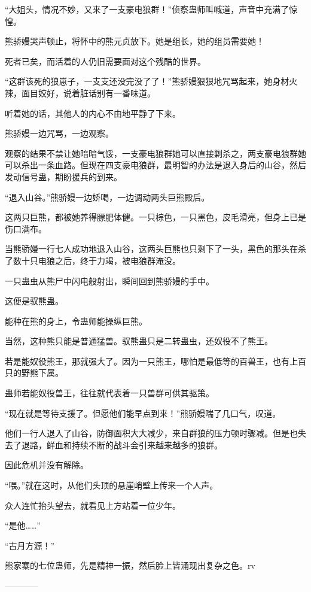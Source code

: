 \begin{this_body}
“大姐头，情况不妙，又来了一支豪电狼群！”侦察蛊师叫喊道，声音中充满了惊惶。

熊骄嫚哭声顿止，将怀中的熊元贞放下。她是组长，她的组员需要她！

死者已矣，而活着的人仍旧需要面对这个残酷的世界。

“这群该死的狼崽子，一支支还没完没了了！”熊骄嫚狠狠地咒骂起来，她身材火辣，面目姣好，说着脏话别有一番味道。

听着她的话，其他人的内心不由地平静了下来。

熊骄嫚一边咒骂，一边观察。

观察的结果不禁让她暗暗气馁，一支豪电狼群她可以直接剿杀之，两支豪电狼群她可以杀出一条血路。但现在四支豪电狼群，最明智的办法是退入身后的山谷，然后发动信号蛊，期盼援兵的到来。

“退入山谷。”熊骄嫚一边娇喝，一边调动两头巨熊殿后。

这两只巨熊，都被她养得膘肥体健。一只棕色，一只黑色，皮毛滑亮，但身上已是伤口满布。

当熊骄嫚一行七人成功地退入山谷，这两头巨熊也只剩下了一头，黑色的那头在杀了数十只电狼之后，终于力竭，被电狼群淹没。

一只蛊虫从熊尸中闪电般射出，瞬间回到熊骄嫚的手中。

这便是驭熊蛊。

能种在熊的身上，令蛊师能操纵巨熊。

当然，这种熊只能是普通猛兽。驭熊蛊只是二转蛊虫，还奴役不了熊王。

若是能奴役熊王，那就强大了。因为一只熊王，哪怕是最低等的百兽王，也有上百只的野熊下属。

蛊师若能奴役兽王，往往就代表着一只兽群可供其驱策。

“现在就是等待支援了。但愿他们能早点到来！”熊骄嫚喘了几口气，叹道。

他们一行人退入了山谷，防御面积大大减少，来自群狼的压力顿时骤减。但是也失去了退路，鲜血和持续不断的战斗会引来越来越多的狼群。

因此危机并没有解除。

“喂。”就在这时，从他们头顶的悬崖峭壁上传来一个人声。

众人连忙抬头望去，就看见上方站着一位少年。

“是他……”

“古月方源！”

熊家寨的七位蛊师，先是精神一振，然后脸上皆涌现出复杂之色。rv

------------

\end{this_body}


